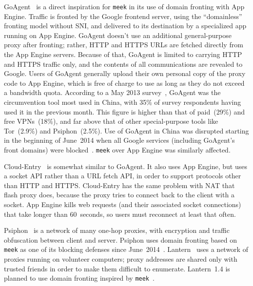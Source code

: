 \documentclass[conference]{IEEEtran}
\newcommand{\meek}{\texttt{meek}\xspace}
\begin{document}
GoAgent~\cite{goagent} is a direct inspiration for \meek in its use of
domain fronting with App Engine.
Traffic is fronted by the Google frontend server,
using the ``domainless'' fronting model without SNI,
and delivered to its destination by a specialized app running on App Engine.
GoAgent doesn't use an additional general-purpose proxy after fronting;
rather, HTTP and HTTPS URLs are fetched directly from the App Engine servers.
Because of that, GoAgent is limited to carrying HTTP and HTTPS traffic only,
and the contents of all communications are revealed to Google.
Users of GoAgent generally upload their own personal copy of the proxy code to App Engine,
which is free of charge to use as long as they do not exceed a bandwidth quota.
According to a May 2013 survey~\cite{collateral-freedom},
GoAgent was the circumvention tool most used in
China, with 35\% of survey respondents having used it in the previous month.
This figure is higher than that of paid~(29\%) and free VPNs~(18\%), and far
above that of other special-purpose tools like Tor~(2.9\%) and Psiphon~(2.5\%).
Use of GoAgent in China was disrupted starting in the beginning of June~2014
when all Google services (including GoAgent's front domains) were blocked~\cite{cn-google-block}.
\meek over App Engine was similarly affected.

Cloud-Entry~\cite{cloud-entry} is somewhat similar to GoAgent.
It also uses App Engine, but uses a socket API rather than a URL fetch API,
in order to support protocols other than HTTP and HTTPS.
Cloud-Entry has the same problem with NAT that flash proxy does,
because the proxy tries to connect back to the client with a socket.
App Engine kills web requests (and their associated socket connections)
that take longer than 60~seconds,
so users must reconnect at least that often.

Psiphon~\cite{psiphon} is a network of many one-hop proxies,
with encryption and traffic obfuscation between client and server.
Psiphon uses domain fronting based on \meek as one of its blocking defenses since June~2014~\cite{psiphon-meek-merge}.
Lantern~\cite{lantern} uses a network of proxies running on volunteer computers;
proxy addresses are shared only with trusted friends in order to make them difficult to enumerate.
Lantern~1.4 is planned to use domain fronting inspired by \meek~\cite{lantern-1.3.1}.

\end{document}
